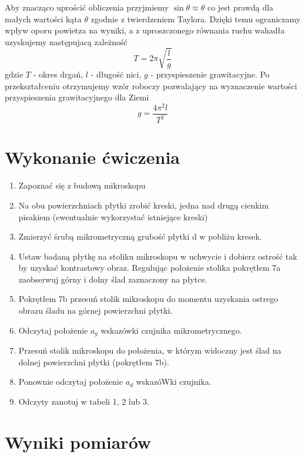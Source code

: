\documentclass[a4paper,10pt,twoside]{article}
\begin{document}
	Aby znacząco uprościć obliczenia przyjmiemy $\sin\theta\approx\theta$ co jest prawdą dla małych wartości kąta $\theta$ zgodnie z
	twierdzeniem Taylora. Dzięki temu ograniczamy wpływ oporu powietza na wyniki, a z uproszczonego równania ruchu wahadła
	uzyskujemy następujacą zależność
	\begin{equation}
	T=2\pi\sqrt{\frac{l}{g}}
	\end{equation}
	gdzie $T$ - okres drgań, $l$ - długość nici, $g$ - przyspieszenie grawitacyjne. Po przekształceniu otrzymujemy wzór roboczy pozwalający
	na wyznaczenie wartości przyspieszenia grawitacyjnego dla Ziemi
	\begin{equation}
	\label{eq:working_g}
	g=\frac{4\pi^2l}{T^2}
	\end{equation}
	\newpage
	\section{Wykonanie ćwiczenia}
	
	\begin{enumerate}
		\item Zapoznać się z budową mikroskopu
		\item Na obu powierzchniach płytki zrobić kreski, jedna nad drugą cienkim pisakiem (ewentualnie wykorzystać istniejące kreski)
		\item Zmierzyć śrubą
		mikrometryczną
		grubość płytki d w pobliżu kresek. 
		\item Ustaw  badaną
		płytkę
		na  stoliku  mikroskopu  w  uchwycie  i  dobierz  ostrość
		tak  by  uzyskać
		kontrastowy obraz. Regulując położenie stolika pokrętłem 7a zaobserwuj górny i dolny 
		ślad zaznaczony na płytce. 
		\item Pokrętłem 7b przesuń stolik mikroskopu do momentu uzyskania ostrego obrazu śladu na górnej powierzchni płytki.
		\item Odczytaj położenie $a_g$ wskazówki czujnika mikrometrycznego. 
		\item Przesuń stolik mikroskopu do położenia, w którym widoczny jest ślad na dolnej powierzchni płytki (pokrętłem 7b). 
		\item Ponownie odczytaj położenie $a_d$ wskazóWki czujnika.
		\item Odczyty zanotuj w tabeli 1, 2 lub 3.
	\end{enumerate}
	
	
	\section{Wyniki pomiarów}
\end{document}
